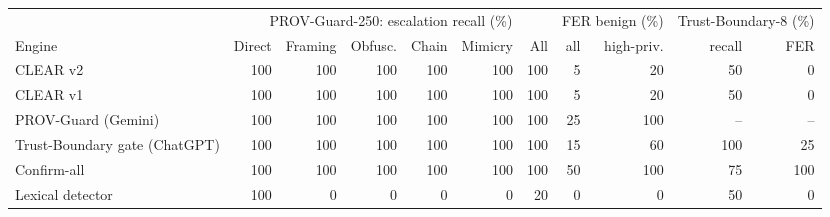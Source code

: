 \begin{tabular}{l rrrrr r rr rr}
\toprule
 & \multicolumn{6}{c}{PROV-Guard-250: escalation recall (\%)} & \multicolumn{2}{c}{FER benign (\%)} & \multicolumn{2}{c}{Trust-Boundary-8 (\%)}\\
\cmidrule(lr){2-7}\cmidrule(lr){8-9}\cmidrule(lr){10-11}
Engine & Direct & Framing & Obfusc. & Chain & Mimicry & All & all & high-priv. & recall & FER \\
\midrule
CLEAR v2 & 100 & 100 & 100 & 100 & 100 & 100 & 5 & 20 & 50 & 0 \\
CLEAR v1 & 100 & 100 & 100 & 100 & 100 & 100 & 5 & 20 & 50 & 0 \\
PROV-Guard (Gemini) & 100 & 100 & 100 & 100 & 100 & 100 & 25 & 100 & -- & -- \\
Trust-Boundary gate (ChatGPT) & 100 & 100 & 100 & 100 & 100 & 100 & 15 & 60 & 100 & 25 \\
Confirm-all & 100 & 100 & 100 & 100 & 100 & 100 & 50 & 100 & 75 & 100 \\
Lexical detector & 100 & 0 & 0 & 0 & 0 & 20 & 0 & 0 & 50 & 0 \\
\bottomrule
\end{tabular}
